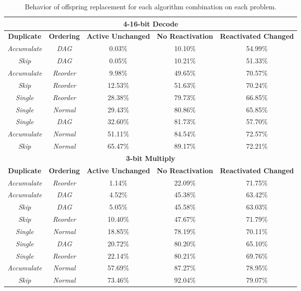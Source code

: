 \documentclass[journal]{IEEEtran}
\begin{document}
\begin{table*}
\begin{tabular}{|c|c|c|c|c|}
  \multicolumn{5}{|c|}{\textbf{4-16-bit Decode}} \\ \hline

\textbf{Duplicate} & \textbf{Ordering} & \textbf{Active Unchanged} & \textbf{No Reactivation} & \textbf{Reactivated Changed} \\ \hline
 \emph{Accumulate} &     \emph{DAG} & 0.03\% & 10.10\% & 54.99\% \\ \hline
       \emph{Skip} &     \emph{DAG} & 0.05\% & 10.21\% & 51.33\% \\ \hline
 \emph{Accumulate} & \emph{Reorder} & 9.98\% & 49.65\% & 70.57\% \\ \hline
       \emph{Skip} & \emph{Reorder} & 12.53\% & 51.63\% & 70.24\% \\ \hline
     \emph{Single} & \emph{Reorder} & 28.38\% & 79.73\% & 66.85\% \\ \hline
     \emph{Single} &  \emph{Normal} & 29.43\% & 80.86\% & 65.85\% \\ \hline
     \emph{Single} &     \emph{DAG} & 32.60\% & 81.73\% & 57.70\% \\ \hline
 \emph{Accumulate} &  \emph{Normal} & 51.11\% & 84.54\% & 72.57\% \\ \hline
   \rowcolor{Gray}
       \emph{Skip} &  \emph{Normal} & 65.47\% & 89.17\% & 72.21\% \\ \hline\hline

  \multicolumn{5}{|c|}{\textbf{3-bit Multiply}} \\ \hline

\textbf{Duplicate} & \textbf{Ordering} & \textbf{Active Unchanged} & \textbf{No Reactivation} & \textbf{Reactivated Changed} \\ \hline
 \emph{Accumulate} & \emph{Reorder} & 1.14\% & 22.09\% & 71.75\% \\ \hline
 \emph{Accumulate} &     \emph{DAG} & 4.52\% & 45.38\% & 63.42\% \\ \hline
       \emph{Skip} &     \emph{DAG} & 5.05\% & 45.58\% & 63.03\% \\ \hline
       \emph{Skip} & \emph{Reorder} & 10.40\% & 47.67\% & 71.79\% \\ \hline
     \emph{Single} &  \emph{Normal} & 18.85\% & 78.19\% & 70.11\% \\ \hline
     \emph{Single} &     \emph{DAG} & 20.72\% & 80.20\% & 65.10\% \\ \hline
     \emph{Single} & \emph{Reorder} & 22.14\% & 80.21\% & 69.76\% \\ \hline
 \emph{Accumulate} &  \emph{Normal} & 57.69\% & 87.27\% & 78.95\% \\ \hline
   \rowcolor{Gray}
       \emph{Skip} &  \emph{Normal} & 73.46\% & 92.04\% & 79.07\% \\ \hline
	\end{tabular}
	\caption{Behavior of offspring replacement for each algorithm combination
	         on each problem.}
	\label{tab:reactivate}
\end{table*}
\end{document}

